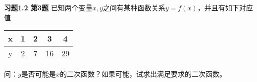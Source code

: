 
\renewcommand{\newpageorvspace}{\vspace{2em}}

\date{2022-09-09  第一次习题课}
\author{}



\maketitle


{\bf 习题1.2 第3题} 已知两个变量$x,y$之间有某种函数关系$y=f(x)$，并且有如下对应值
\begin{table}[H]
    \centering
    \begin{tabular}{|c|c|c|c|c|}
    \toprule
         x & 1 & 2 & 3 & 4 \\ \hline
         y & 2 & 7 & 16 & 29 \\
    \bottomrule
    \end{tabular}
\end{table}
问：$y$是否可能是$x$的二次函数？如果可能，试求出满足要求的二次函数。

\newpageorvspace

